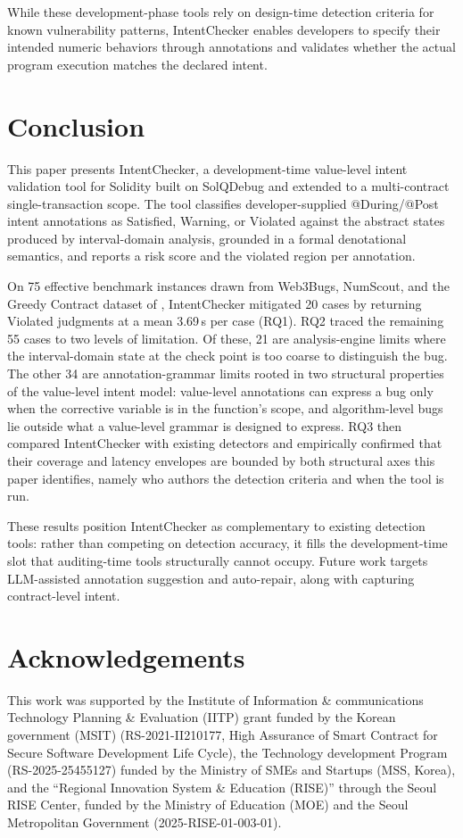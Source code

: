 \documentclass[pdflatex,sn-basic]{sn-jnl}%
\theoremstyle{thmstyleone}%
\theoremstyle{thmstyletwo}%
\theoremstyle{thmstylethree}%
\begin{document}
While these development-phase tools rely on design-time detection criteria for known vulnerability patterns,
IntentChecker enables developers to specify their intended numeric behaviors through annotations and validates whether the actual program execution matches the declared intent.

\section{Conclusion}\label{sec:conclusion}

This paper presents IntentChecker, a development-time value-level intent validation tool for Solidity built on SolQDebug and extended to a multi-contract single-transaction scope. The tool classifies developer-supplied @During/@Post intent annotations as Satisfied, Warning, or Violated against the abstract states produced by interval-domain analysis, grounded in a formal denotational semantics, and reports a risk score and the violated region per annotation.

On 75 effective benchmark instances drawn from Web3Bugs, NumScout, and the Greedy Contract dataset of \citet{flyinointment}, IntentChecker mitigated 20 cases by returning Violated judgments at a mean 3.69\,s per case (RQ1). RQ2 traced the remaining 55 cases to two levels of limitation. Of these, 21 are analysis-engine limits where the interval-domain state at the check point is too coarse to distinguish the bug. The other 34 are annotation-grammar limits rooted in two structural properties of the value-level intent model: value-level annotations can express a bug only when the corrective variable is in the function's scope, and algorithm-level bugs lie outside what a value-level grammar is designed to express. RQ3 then compared IntentChecker with existing detectors and empirically confirmed that their coverage and latency envelopes are bounded by both structural axes this paper identifies, namely who authors the detection criteria and when the tool is run.

These results position IntentChecker as complementary to existing detection tools: rather than competing on detection accuracy, it fills the development-time slot that auditing-time tools structurally cannot occupy. Future work targets LLM-assisted annotation suggestion and auto-repair, along with capturing contract-level intent.

\section*{Acknowledgements}
This work was supported by the Institute of Information \& communications Technology Planning \& Evaluation (IITP) grant funded by the Korean government (MSIT) (RS-2021-II210177, High Assurance of Smart Contract for Secure Software Development Life Cycle), the Technology development Program (RS-2025-25455127) funded by the Ministry of SMEs and Startups (MSS, Korea), and the ``Regional Innovation System \& Education (RISE)'' through the Seoul RISE Center, funded by the Ministry of Education (MOE) and the Seoul Metropolitan Government (2025-RISE-01-003-01).
\end{document}
